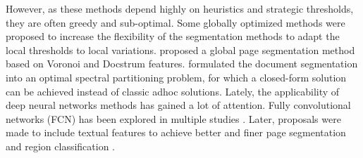 \documentclass[letterpaper]{article} %
\begin{document}
However, as these methods depend highly on heuristics and strategic thresholds, they are often greedy and sub-optimal. Some globally optimized methods were proposed to increase the flexibility of the segmentation methods to adapt the local thresholds to local variations. \cite{DBLP:conf/icdar/AgrawalD09a}
proposed a global page segmentation method based on Voronoi and Docstrum features.
\cite{DBLP:conf/icvgip/DasigiJJ08} formulated the document segmentation into an optimal spectral partitioning problem, for which a closed-form solution can be achieved instead of classic adhoc solutions. Lately, the applicability of deep neural networks methods has gained a lot of attention. Fully convolutional networks (FCN) has been explored in multiple studies \cite{DBLP:conf/icfhr/OliveiraSK18} \cite{DBLP:conf/das/WickP18} \cite{DBLP:conf/icdar/MeierSSAC17}. Later, proposals were made to include textual features to achieve better and finer page segmentation and region classification \cite{DBLP:journals/corr/abs-2002-06144} \cite{DBLP:conf/emnlp/KattiRGBBHF18}. 
\end{document}
